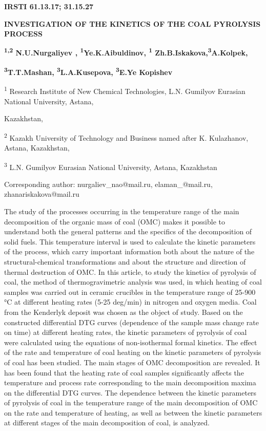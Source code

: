 \newpage
{\bfseries IRSTI 61.13.17; 31.15.27}

{\bfseries INVESTIGATION OF THE KINETICS OF THE COAL PYROLYSIS PROCESS}

{\bfseries \textsuperscript{1,2} N.U.Nurgaliyev ,
\textsuperscript{1}Ye.K.Aibuldinov, \textsuperscript{1}
Zh.B.Iskakova,\textsuperscript{3}A.Kolpek,}

{\bfseries \textsuperscript{3}T.T.Mashan, \textsuperscript{3}L.A.Kusepova,
\textsuperscript{3}E.Ye Kopishev}

\textsuperscript{1} Research Institute of New Chemical Technologies,
L.N. Gumilyov Eurasian National University, Astana,

Kazakhstan,

\textsuperscript{2} Kazakh University of Technology and Business named
after K. Kulazhanov, Astana, Kazakhstan,

\textsuperscript{3} L.N. Gumilyov Eurasian National University, Astana,
Kazakhstan

Corresponding author: nurgaliev\_nao@mail.ru, elaman\_@mail.ru,
zhanariskakova@mail.ru

The study of the processes occurring in the temperature range of the
main decomposition of the organic mass of coal (OMC) makes it possible
to understand both the general patterns and the specifics of the
decomposition of solid fuels. This temperature interval is used to
calculate the kinetic parameters of the process, which carry important
information both about the nature of the structural-chemical
transformations and about the structure and direction of thermal
destruction of OMC. In this article, to study the kinetics of pyrolysis
of coal, the method of thermogravimetric analysis was used, in which
heating of coal samples was carried out in ceramic crucibles in the
temperature range of 25-900 °C at different heating rates (5-25 deg/min)
in nitrogen and oxygen media. Coal from the Kenderlyk deposit was chosen
as the object of study. Based on the constructed differential DTG curves
(dependence of the sample mass change rate on time) at different heating
rates, the kinetic parameters of pyrolysis of coal were calculated using
the equations of non-isothermal formal kinetics. The effect of the rate
and temperature of coal heating on the kinetic parameters of pyrolysis
of coal has been studied. The main stages of OMC decomposition are
revealed. It has been found that the heating rate of coal samples
significantly affects the temperature and process rate corresponding to
the main decomposition maxima on the differential DTG curves. The
dependence between the kinetic parameters of pyrolysis of coal in the
temperature range of the main decomposition of OMC on the rate and
temperature of heating, as well as between the kinetic parameters at
different stages of the main decomposition of coal, is analyzed.

